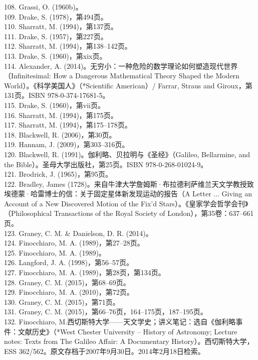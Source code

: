 108. Grassi, O. (1960b)。\\
109. Drake, S. (1978)，第494页。\\
110. Sharratt, M. (1994)，第137页。\\
111. Drake, S. (1957)，第227页。\\
112. Sharratt, M. (1994)，第138–142页。\\
113. Drake, S. (1960)，第xix页。\\
114. Alexander, A. (2014)。无穷小：一种危险的数学理论如何塑造现代世界（Infinitesimal: How a Dangerous Mathematical Theory Shaped the Modern World）。《科学美国人》（*Scientific American）/ Farrar, Straus and Giroux，第131页。ISBN 978-0-374-17681-5。\\
115. Drake, S. (1960)，第vii页。\\
116. Sharratt, M. (1994)，第175页。\\
117. Sharratt, M. (1994)，第175–178页。\\
118. Blackwell, R. (2006)，第30页。\\
119. Hannam, J. (2009)，第303–316页。\\
120. Blackwell, R. (1991)。伽利略、贝拉明与《圣经》（Galileo, Bellarmine, and the Bible）。圣母大学出版社，第25页。ISBN 978-0-268-01024-9。\\
121. Brodrick, J. (1965)，第95页。\\
122. Bradley, James (1728)。来自牛津大学詹姆斯·布拉德利萨维兰天文学教授致埃德蒙·哈雷博士的信：关于固定星体新发现运动的报告（A Letter ... Giving an Account of a New Discovered Motion of the Fix'd Stars）。《皇家学会哲学会刊》（Philosophical Transactions of the Royal Society of London），第35卷：637–661页。\\
123. Graney, C. M. & Danielson, D. R. (2014)。\\
124. Finocchiaro, M. A. (1989)，第27–28页。\\
125. Finocchiaro, M. A. (1989)。\\
126. Langford, J. A. (1998)，第56–57页。\\
127. Finocchiaro, M. A. (1989)，第28页，第134页。\\
128. Graney, C. M. (2015)，第68–69页。\\
129. Finocchiaro, M. A. (2010)，第72页。\\
130. Graney, C. M. (2015)，第71页。\\
131. Graney, C. M. (2015)，第66–76页，164–175页，187–195页。\\
132. Finocchiaro, M.西切斯特大学——天文学史；讲义笔记：选自《伽利略事件：文献历史》（*West Chester University – History of Astronomy; Lecture notes: Texts from The Galileo Affair: A Documentary History）。西切斯特大学，ESS 362/562。原文存档于2007年9月30日。2014年2月18日检索。\\
